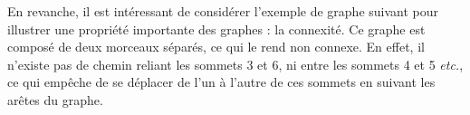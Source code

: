 \documentclass[hidelinks,letterpaper,12pt]{article}
\newcounter{Exemple} %
\begin{document}
\begin{itemize}
\begin{figure}[H]
	\label{Exemple 2 d'un graphe non-connexe}	
\end{figure}
En revanche, il est intéressant de considérer l'exemple de graphe suivant pour illustrer une propriété importante des graphes : la connexité. Ce graphe est composé de deux morceaux séparés, ce qui le rend non connexe. En effet, il n'existe pas de chemin reliant les sommets 3 et 6, ni entre les sommets 4 et 5 \textit{etc.}, ce qui empêche de se déplacer de l'un à l'autre de ces sommets en suivant les arêtes du graphe. \\
\end{itemize}
\bigbreak

\end{document}
